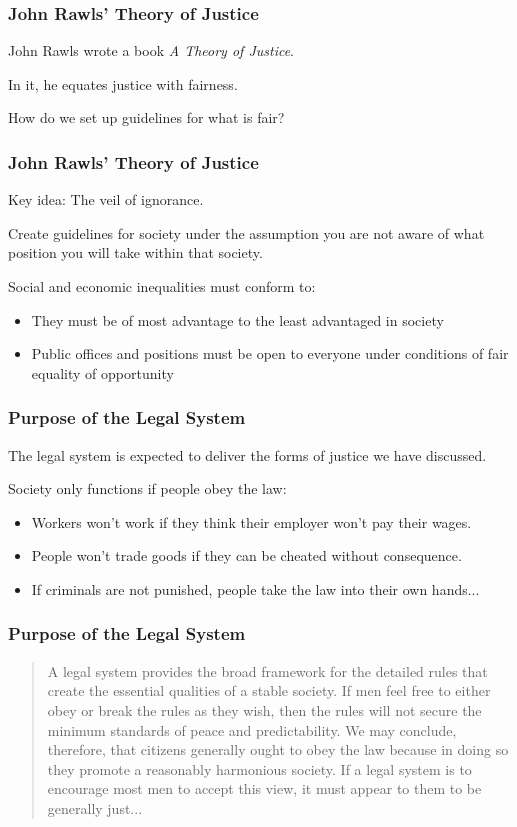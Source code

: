 \begin{frame}
\frametitle{John Rawls' Theory of Justice}

John Rawls wrote a book \textit{A Theory of Justice}.

In it, he equates justice with fairness.

How do we set up guidelines for what is fair?


\end{frame}



\begin{frame}
\frametitle{John Rawls' Theory of Justice}

Key idea: \alert{The veil of ignorance}.

Create guidelines for society under the assumption you are not aware of what position you will take within that society.


Social and economic inequalities must conform to:
\begin{itemize}
\item They must be of most advantage to the least advantaged in society
\item Public offices and positions must be open to everyone under conditions of fair equality of opportunity
\end{itemize}


\end{frame}



\begin{frame}
\frametitle{Purpose of the Legal System}

The legal system is expected to deliver the forms of justice we have discussed.

Society only functions if people obey the law:
\begin{itemize}
\item Workers won't work if they think their employer won't pay their wages.
\item People won't trade goods if they can be cheated without consequence.
\item If criminals are not punished, people take the law into their own hands...
\end{itemize}


\end{frame}



\begin{frame}
\frametitle{Purpose of the Legal System}

\begin{quote}
A legal system provides the broad framework for the detailed rules that create the essential qualities of a stable society. If men feel free to either obey or break the rules as they wish, then the rules will not secure the minimum standards of peace and predictability. We may conclude, therefore, that citizens generally ought to obey the law because in doing so they promote a reasonably harmonious society. If a legal system is to encourage most men to accept this view, it must appear to them to be generally just...
\end{quote}
\hfill~\cite{lba}

\end{frame}





